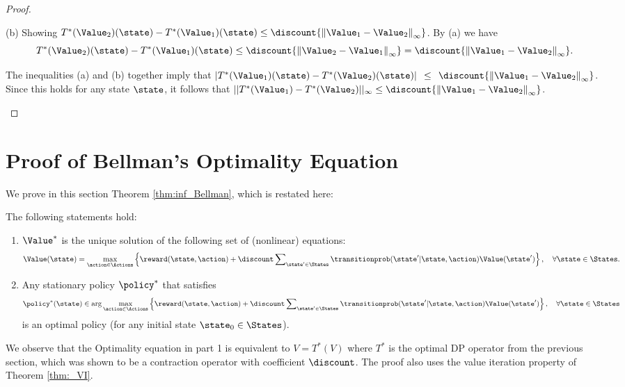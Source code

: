 \begin{proof}
\begin{enumerate}
(b) Showing $T_{}^*({\Value_2})(\state) - T_{}^*({\Value_1})(\state)
\le \discount {\left\| {{\Value_1} - {\Value_2}} \right\|_\infty }$.
By (a) we have
$$
T_{}^*({\Value_2})(\state) - T_{}^*({\Value_1})(\state) \le
\discount {\left\| {{\Value_2} - {\Value_1}} \right\|_\infty }=
\discount {\left\| {{\Value_1} - {\Value_2}} \right\|_\infty }.
$$

The inequalities (a) and (b) together imply that
$|T_{}^*({\Value_1})(\state) - T_{}^*({\Value_2})(\state)|\;\, \le
\;\,\discount {\left\| {{\Value_1} - {\Value_2}} \right\|_\infty }$.
Since this holds for any state $\state$, it follows that
$||T_{}^*({\Value_1}) - T_{}^*({\Value_2})|{|_\infty } \le \discount
{\left\| {{\Value_1} - {\Value_2}} \right\|_\infty }$.
\end{enumerate}
\end{proof}


\section{Proof of Bellman's Optimality Equation}
\label{sec:Bellman-Opt}

 We prove in this section Theorem \ref{thm:inf_Bellman},
which is restated here:
\begin{theorem*}
The following statements hold:
\begin{enumerate}
  \item $\Value_{}^*$ is the unique solution of the following set of (nonlinear) equations:
\begin{equation}\label{eq:Bellman2}
\Value(\state) = \mathop {\max }\limits_{\action \in \Actions}
\left\{ {\reward(\state,\action) + \discount \sum\nolimits_{\state'
\in \States} {\transitionprob(\state'|\state,\action)\Value(\state')} } \right\},
\quad \forall \state \in \States.
\end{equation}
  \item Any stationary policy ${\policy ^*}$ that satisfies
\[{\policy ^*}(\state) \in \arg {\max _{\action \in \Actions}}\left\{ {\reward(\state,\action) + \discount \sum\nolimits_{\state' \in \States} {\transitionprob(\state'|\state,\action)\Value(\state')} } \right\},
\quad \forall \state \in \States\]
     is an optimal policy (for any initial state ${\state_0} \in \States$).
\end{enumerate}
\end{theorem*}
We observe that the Optimality equation in part 1 is equivalent to
$V = {T^*}(V)$ where ${T^*}$ is the optimal DP operator from the
previous section, which was shown to be a contraction operator with
coefficient $\discount $.  The proof also uses the value iteration
property of Theorem \ref{thm:_VI}.

